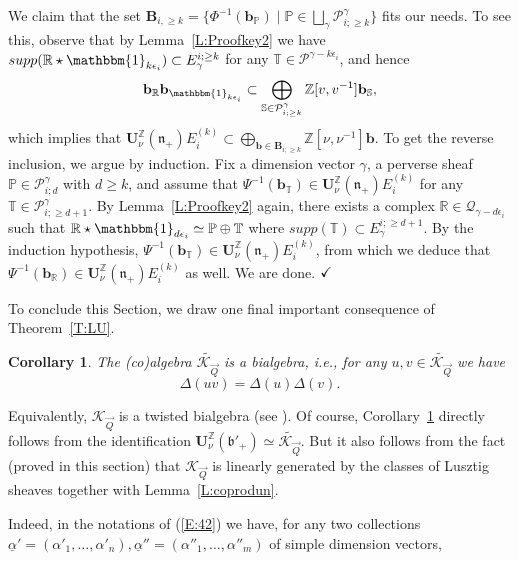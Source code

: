 \documentclass[a4paper,10pt]{amsart}
\def\Z{\mathbb{Z}}
\def\U{\mathbf{U}}
\def\qed{$\hfill \checkmark$}
\def\a{\alpha}
\def\bo{\mathfrak{b}}
\def\n{\mathfrak{n}}
\def\KQ{\mathcal{K}_{\vec{Q}}}
\newtheorem{cor}[theo]{Corollary}
\numberwithin{equation}{section}
\begin{document}
We claim that the set $\mathbf{B}_{i,\geq k}=\big\{\Phi^{-1}(\mathbf{b}_{\mathbb{P}})\;|\; \mathbb{P} \in  \bigsqcup_{\gamma} \mathcal{P}^{\gamma}_{i;\geq k}\big\}$ fits our needs. To see this, observe that by Lemma~\ref{L:Proofkey2} we have $supp (\mathbb{R} \star \mathbbm{1}_{k\epsilon_i}) \subset E_{\gamma}^{i;\geq k}$ for any $\mathbb{T} \in \mathcal{P}^{\gamma-k\epsilon_i}$, and hence 
$$\mathbf{b}_{\mathbb{R}} \mathbf{b}_{\mathbbm{1}_{k\epsilon_i}}\subset \bigoplus_{\mathbb{S} \in \mathcal{P}^{\gamma}_{i;\geq k}} \Z[v,v^{-1}] \mathbf{b}_{\mathbb{S}},$$ 
which implies that $\U_{\nu}^{\Z}(\n_+) E_i^{(k)} \subset \bigoplus_{\mathbf{b} \in \mathbf{B}_{i;\geq k}} \Z[\nu,\nu^{-1}] \mathbf{b}$. To get the reverse inclusion, we argue by induction. Fix a dimension vector $\gamma$, a perverse sheaf $\mathbb{P} \in \mathcal{P}^{\gamma}_{i ; d}$ with $d \geq k$, and assume that $\Psi^{-1}(\mathbf{b}_{\mathbb{T}}) \in \U_{\nu}^{\Z}(\n_+) E_i^{(k)}$ for any $\mathbb{T} \in \mathcal{P}^{\gamma}_{i; \geq d+1}$. By Lemma~\ref{L:Proofkey2} again, there exists a complex $\mathbb{R} \in \mathcal{Q}_{\gamma-d\epsilon_i}$ such that $\mathbb{R} \star \mathbbm{1}_{d\epsilon_i} \simeq \mathbb{P} \oplus \mathbb{T}$ where $supp(\mathbb{T}) \subset E_{\gamma}^{i;\geq d+1}$. By the induction hypothesis, $\Psi^{-1}(\mathbf{b}_{\mathbb{T}}) \in \U_{\nu}^{\Z}(\n_+) E_i^{(k)}$, from which we deduce that $\Psi^{-1}(\mathbf{b}_{\mathbb{R}}) \in \U_{\nu}^{\Z}(\n_+) E_i^{(k)}$ as well. We are done. \qed

\vspace{.2in}

To conclude this Section, we draw one final important consequence of Theorem~\ref{T:LU}.

\vspace{.1in}

\begin{cor}\label{C:bialg} The (co)algebra  $\widetilde{\KQ}$ is a bialgebra, i.e., for any $u,v \in \widetilde{\KQ}$ we have
$$\Delta(uv)=\Delta(u)\Delta(v).$$
\end{cor}

Equivalently, $\KQ$ is a {\rm{twisted}} bialgebra (see \cite[Lecture~1]{Trieste} ). Of course, Corollary~\ref{C:bialg} directly follows from the identification $\U_\nu^{\Z}(\bo'_+) \simeq \widetilde{\KQ}$. But it also follows from the fact (proved in this section) that $\KQ$ is linearly generated by the classes of Lusztig sheaves together with Lemma~\ref{L:coprodun}. 

Indeed, in the notations of (\ref{E:42}) we have, for any two collections $\underline{\a}'=(\a'_1, \ldots, \a'_n), \underline{\a}''=(\a''_1, \ldots, \a''_m)$ of simple dimension vectors,
\end{document}
